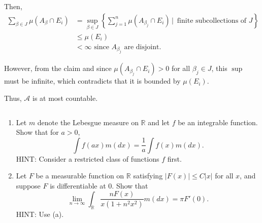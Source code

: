 \documentclass[12pt]{Qual}
\begin{document}
\begin{solution}
Then, \begin{align*}
    \sum_{\beta\in J}\mu(A_\beta\cap E_i)&=\sup_{\beta\in J}\left\{\sum_{j=1}^n\mu(A_{\beta_j}\cap E_i)\,|\,\text{ finite subcollections of }J\right\}\\
    &\le\mu(E_i)\\
    &<\infty\text{ since }A_{\beta_j}\text{ are disjoint}.
\end{align*}

However, from the claim and since $\mu(A_{\beta_j}\cap E_i)>0$ for all $\beta_j\in J$, this $\sup$ must be infinite, which contradicts that it is bounded by $\mu(E_i)$.

Thus, $\mathscr{A}$ is at most countable.
\end{solution}
\newpage

\begin{problem} $\,$
\begin{enumerate}[label=(\alph*)]
    \item Let $m$ denote the Lebesgue measure on $\mathbb{R}$ and let $f$ be an integrable function. Show that for $a>0$, $$\int f(ax)m(dx)=\frac{1}{a}\int f(x)m(dx).$$ HINT: Consider a restricted class of functions $f$ first.
    \item Let $F$ be a measurable function on $\mathbb{R}$ satisfying $|F(x)|\le C|x|$ for all $x$, and suppose $F$ is differentiable at $0$. Show that $$\lim_{n\to\infty}\int_\mathbb{R}\frac{nF(x)}{x(1+n^2x^2)}m(dx)=\pi F'(0).$$ HINT: Use (a).
\end{enumerate}
\end{problem}
\end{document}
